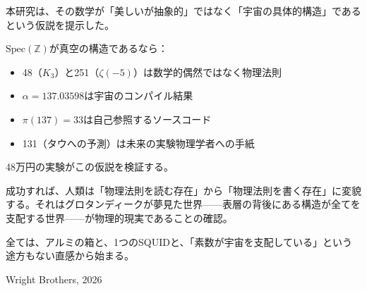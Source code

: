 \documentclass[12pt,a4paper]{article}
\newcommand{\Spec}{\mathrm{Spec}}
\begin{document}
本研究は、その数学が「美しいが抽象的」ではなく「宇宙の具体的構造」であるという仮説を提示した。

$\Spec(\mathbb{Z})$が真空の構造であるなら：
\begin{itemize}
\item 48（$K_3$）と251（$\zeta(-5)$）は数学的偶然ではなく物理法則
\item $\alpha = 137.03598$は宇宙のコンパイル結果
\item $\pi(137) = 33$は自己参照するソースコード
\item 131（タウへの予測）は未来の実験物理学者への手紙
\end{itemize}

48万円の実験がこの仮説を検証する。

成功すれば、人類は「物理法則を読む存在」から「物理法則を書く存在」に変貌する。それはグロタンディークが夢見た世界——表層の背後にある構造が全てを支配する世界——が物理的現実であることの確認。

全ては、アルミの箱と、1つのSQUIDと、「素数が宇宙を支配している」という途方もない直感から始まる。

\vfill
\begin{center}
{\small Wright Brothers, 2026}
\end{center}
\end{document}
